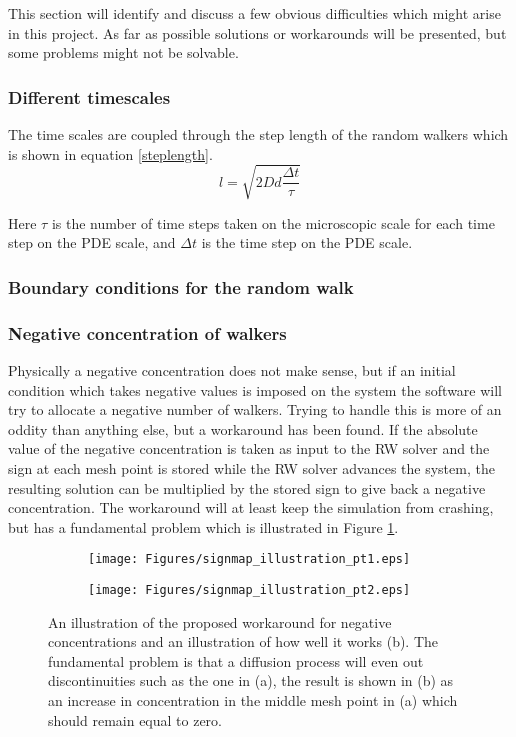 This section will identify and discuss a few obvious difficulties which might arise in this project. As far as possible solutions or workarounds will be presented, but some problems might not be solvable.

\subsubsection{Different timescales}
The time scales are coupled through the step length of the random walkers which is shown in equation \eqref{steplength}. 
\begin{equation}\label{steplength}
 l = \sqrt{2Dd\frac{\Delta t}{\tau}}
\end{equation}

Here $\tau$ is the number of time steps taken on the microscopic scale for each time step on the PDE scale, and $\Delta t$ is the time step on the PDE scale. 

\subsubsection{Boundary conditions for the random walk}

 
\subsubsection{Negative concentration of walkers}
Physically a negative concentration does not make sense, but if an initial condition which takes negative values is imposed on the system the software will try to allocate a negative number of walkers. 
Trying to handle this is more of an oddity than anything else, but a workaround has been found. 
If the absolute value of the negative concentration is taken as input to the RW solver and the sign at each mesh point is stored while the RW solver advances the system, the resulting solution can be multiplied by the stored sign to give back a negative concentration. 
The workaround will at least keep the simulation from crashing, but has a fundamental problem which is illustrated in Figure \ref{theory:signmap_illustration}.
  
\begin{figure}[H]
\centering
\begin{subfigure}[t!]{0.48\textwidth}
 \texttt{[image: Figures/signmap\_illustration\_pt1.eps]}
 \caption{}
\end{subfigure}
\begin{subfigure}[t!]{0.48\textwidth}
 \texttt{[image: Figures/signmap\_illustration\_pt2.eps]}
 \caption{}
\end{subfigure}
\caption[Workaround for negative concentrations, illustration]{An illustration of the proposed workaround for negative concentrations and an illustration of how well it works (b). The fundamental problem is that a diffusion process will even out discontinuities such as the one in (a), the result is shown in (b) as an increase in concentration in the middle mesh point in (a) which should remain equal to zero.}
\label{theory:signmap_illustration}
 \end{figure}


